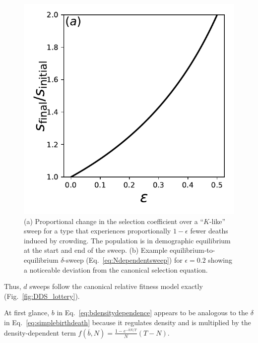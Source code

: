 \documentclass[12pt]{article}
\begin{document}
\begin{figure}
\centering
\includegraphics[scale=0.8]{strengthofselection.pdf}
\caption{\label{fig:strengthofselection} (a) Proportional change in the selection coefficient over a ``$K$-like'' sweep for a type that experiences proportionally $1-\epsilon$ fewer deaths induced by crowding. The population is in demographic equilibrium at the start and end of the sweep. (b) Example equilibrium-to-equilibrium $\delta$-sweep (Eq.~\ref{eq:Ndependentsweep}) for $\epsilon=0.2$ showing a noticeable deviation from the canonical selection equation.}
\end{figure}


 Thus, $d$ sweeps follow the canonical relative fitness model exactly (Fig.~\ref{fig:DDS_lottery}).
 
 At first glance, $b$ in Eq.~\eqref{eq:bdensitydependence} appears to be analogous to the $\delta$ in Eq.~\eqref{eq:simplebirthdeath} because it regulates density and is multiplied by the density-dependent term $f(\overline{b},N)=\frac{1-e^{-\overline{b}N/T}}{N}(T-N)$. 
\end{document}
